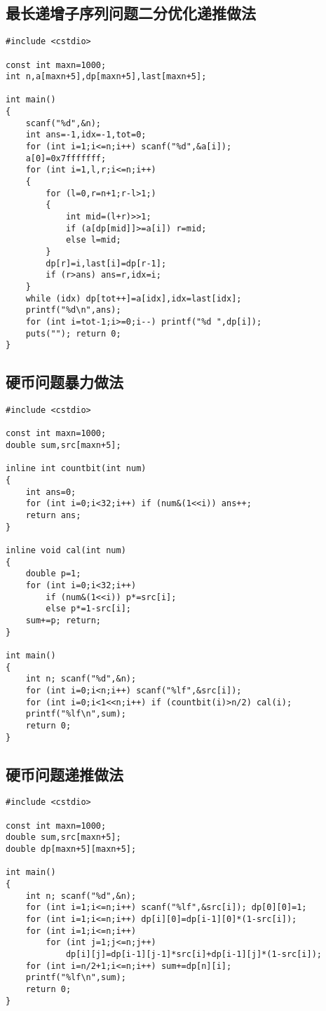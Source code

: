 \documentclass{article}
\begin{document}
\subsection{最长递增子序列问题二分优化递推做法}

\begin{lstlisting}
#include <cstdio>

const int maxn=1000;
int n,a[maxn+5],dp[maxn+5],last[maxn+5];

int main()
{
    scanf("%d",&n);
    int ans=-1,idx=-1,tot=0;
    for (int i=1;i<=n;i++) scanf("%d",&a[i]);
    a[0]=0x7fffffff;
    for (int i=1,l,r;i<=n;i++)
    {
        for (l=0,r=n+1;r-l>1;)
        {
            int mid=(l+r)>>1;
            if (a[dp[mid]]>=a[i]) r=mid;
            else l=mid;
        }
        dp[r]=i,last[i]=dp[r-1];
        if (r>ans) ans=r,idx=i;
    }
    while (idx) dp[tot++]=a[idx],idx=last[idx];
    printf("%d\n",ans);
    for (int i=tot-1;i>=0;i--) printf("%d ",dp[i]);
    puts(""); return 0;
}
\end{lstlisting}

\subsection{硬币问题暴力做法}

\begin{lstlisting}
#include <cstdio>

const int maxn=1000;
double sum,src[maxn+5];

inline int countbit(int num)
{
    int ans=0;
    for (int i=0;i<32;i++) if (num&(1<<i)) ans++;
    return ans;
}

inline void cal(int num)
{
    double p=1;
    for (int i=0;i<32;i++)
        if (num&(1<<i)) p*=src[i];
        else p*=1-src[i];
    sum+=p; return;
}

int main()
{
    int n; scanf("%d",&n);
    for (int i=0;i<n;i++) scanf("%lf",&src[i]);
    for (int i=0;i<1<<n;i++) if (countbit(i)>n/2) cal(i);
    printf("%lf\n",sum);
    return 0;
}
\end{lstlisting}

\subsection{硬币问题递推做法}

\begin{lstlisting}
#include <cstdio>

const int maxn=1000;
double sum,src[maxn+5];
double dp[maxn+5][maxn+5];

int main()
{
    int n; scanf("%d",&n);
    for (int i=1;i<=n;i++) scanf("%lf",&src[i]); dp[0][0]=1;
    for (int i=1;i<=n;i++) dp[i][0]=dp[i-1][0]*(1-src[i]);
    for (int i=1;i<=n;i++)
        for (int j=1;j<=n;j++)
            dp[i][j]=dp[i-1][j-1]*src[i]+dp[i-1][j]*(1-src[i]);
    for (int i=n/2+1;i<=n;i++) sum+=dp[n][i];
    printf("%lf\n",sum);
    return 0;
}
\end{lstlisting}
\end{document}
